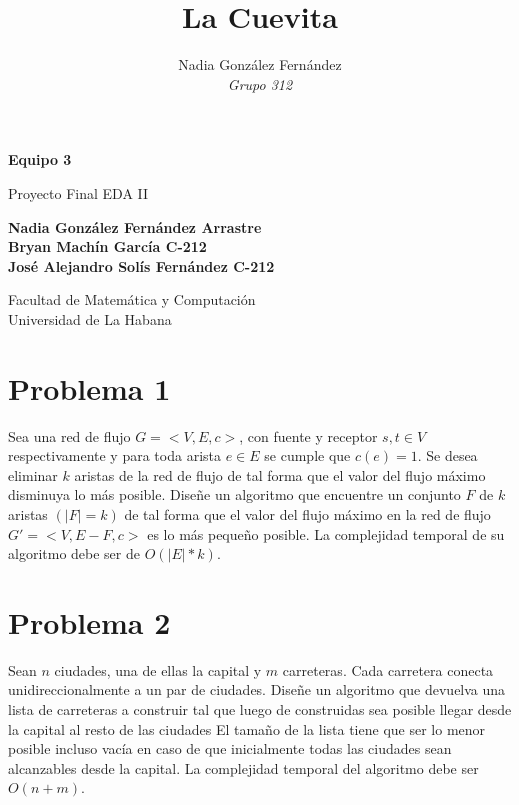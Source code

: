 \documentclass[a4paper,10pt]{article}
\title{\textbf{La Cuevita}}
\author{Nadia González Fernández 
	\\\emph{Grupo 312}}
\date{}
\begin{document}
	\begin{titlepage}
		\begin{center}
			\vspace*{1cm}
			\textbf{Equipo 3}
			
			\vspace{0.5cm}
			Proyecto Final EDA II
			
			\vspace{1.5cm}
			\textbf{Nadia González Fernández \textnormal{Arrastre}
				\\Bryan Machín Garc\'ia \textnormal{C-212}
				\\José Alejandro Sol\'is Fern\'andez \textnormal{C-212}}
			
			\vspace{5cm}
			Facultad de Matemática y Computación\\
			Universidad de La Habana
			
		\end{center}
	\end{titlepage}

	\section{Problema 1}
	Sea una red de flujo $G = <V,E,c>$, con fuente y receptor $s,t \in V$ respectivamente y para toda arista $e \in E$ se cumple que $c(e) = 1$. Se desea eliminar $k$ aristas de la red de flujo de tal forma que el valor del flujo máximo disminuya lo m\'as posible.
	Dise\~ne un algoritmo que encuentre un conjunto $F$ de $k$ aristas $(|F| = k)$ de 	
	tal forma que el valor del flujo máximo en la red de flujo $G' = <V,E - F,c>$ es lo m\'as peque\~no posible. La complejidad temporal de su algoritmo debe ser de $O(|E|*k)$. 
	\section{Problema 2}
	Sean $n$ ciudades, una de ellas la capital y $m$ carreteras. Cada carretera conecta unidireccionalmente a un par de ciudades. Dise\~ne un algoritmo que devuelva una lista de carreteras a construir tal que luego de construidas sea posible llegar desde la capital al resto de las ciudades El tama\~no de la lista tiene que ser lo menor posible incluso vac\'ia en caso de que inicialmente todas las ciudades sean alcanzables desde la capital. La complejidad temporal del algoritmo debe ser $O(n + m)$.
\end{document}
